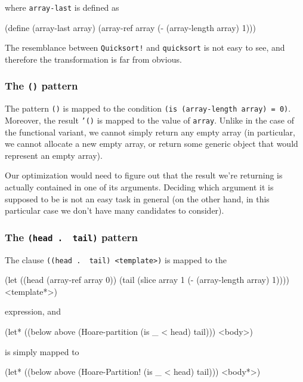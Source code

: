 where \texttt{array-last} is defined as

\begin{Snippet}
(define (array-last array)
  (array-ref array (- (array-length array) 1)))
\end{Snippet}

The resemblance between \texttt{Quicksort!}\,\,and \texttt{quicksort}
is not easy to see, and therefore the transformation is far from obvious.

\subsubsection{The \texttt{()} pattern}

The pattern \texttt{()} is mapped to the condition
\texttt{(is (array-length array) = 0)}. Moreover, the result \texttt{'()}
is mapped to the value of \texttt{array}. Unlike in the case of the functional
variant, we cannot simply return any empty array (in particular, we cannot
allocate a new empty array, or return some generic object that would represent
an empty array).

Our optimization would need to figure out that the result we're returning
is actually contained in one of its arguments. Deciding which argument
it is supposed to be is not an easy task in general (on the other hand, in
this particular case we don't have many candidates to consider).

\subsubsection{The \texttt{(head .\,\,tail)} pattern}

The clause \texttt{((head .\,\,tail) <template>)} is mapped to the
\begin{Snippet}
  (let ((head (array-ref array 0))
        (tail (slice array 1 (- (array-length array) 1))))
    <template*>)
\end{Snippet}

expression, and

\begin{Snippet}
  (let* ((below above (Hoare-partition (is _ < head) tail)))
    <body>)
\end{Snippet}

is simply mapped to

\begin{Snippet}
  (let* ((below above (Hoare-Partition! (is _ < head) tail)))
    <body*>)
\end{Snippet}

